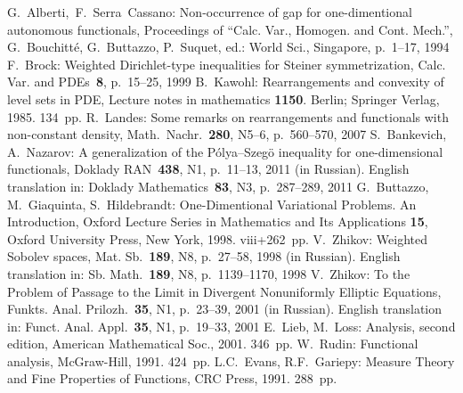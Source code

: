\begin{thebibliography}{99}
 G.~Alberti,~F.~Serra~Cassano: Non-occurrence of gap for one-dimentional autonomous functionals,
Proceedings of ``Calc. Var., Homogen. and Cont. Mech.'', G.~Bouchitt\'e, G.~Buttazzo, P.~Suquet, ed.: World Sci., Singapore, p.~1--17, 1994
 F.~Brock: Weighted Dirichlet-type inequalities for Steiner symmetrization,
Calc. Var. and PDEs~{\bf8}, p.~15--25, 1999
 B.~Kawohl: Rearrangements and convexity of level sets in PDE,
Lecture notes in mathematics {\bf1150}. Berlin; Springer Verlag, 1985. 134~pp.
 R.~Landes: Some remarks on rearrangements and functionals with non-constant density,
Math.~Nachr.~{\bf280}, N5--6, p.~560--570, 2007
 S.~Bankevich, A.~Nazarov: A generalization of the P\'olya--Szeg\"o inequality for one-dimensional functionals,
Doklady RAN~{\bf438}, N1, p.~11--13, 2011 (in Russian).
English translation in:
Doklady Mathematics~{\bf83}, N3, p.~287--289, 2011
 G.~Buttazzo, M.~Giaquinta, S.~Hildebrandt: One-Dimentional Variational Problems. An Introduction,
Oxford Lecture Series in Mathematics and Its Applications {\bf15},
Oxford University Press, New York, 1998. viii+262~pp.
 V.~Zhikov: Weighted Sobolev spaces,
Mat. Sb.~{\bf189}, N8, p.~27--58, 1998 (in Russian).
English translation in:
Sb. Math.~{\bf189}, N8, p.~1139--1170, 1998
 V.~Zhikov: To the Problem of Passage to the Limit in Divergent Nonuniformly Elliptic Equations,
Funkts. Anal. Prilozh.~{\bf35}, N1, p.~23--39, 2001 (in Russian).
English translation in:
Funct. Anal. Appl.~{\bf35}, N1, p.~19--33, 2001
 E.~Lieb, M.~Loss: Analysis, second edition,
American Mathematical Soc., 2001. 346~pp.
 W.~Rudin: Functional analysis,
McGraw-Hill, 1991. 424~pp.
 L.C.~Evans, R.F.~Gariepy: Measure Theory and Fine Properties of Functions,
CRC Press, 1991. 288~pp.

\end{thebibliography}
